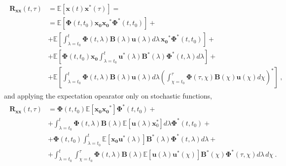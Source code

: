 \documentclass[letterpaper,10pt,english]{jupyterBook}
\begin{document}
\begin{equation*}
\begin{split}\begin{aligned}
  \mathbf{R}_{\mathbf{x} \mathbf{x}}(t, \tau) 
  & = \mathbb{E}\left[ \mathbf{x}(t) \mathbf{x}^*(\tau) \right] = \\
  & = \mathbb{E} \left[ \boldsymbol\Phi(t,t_0) \mathbf{x_0} \mathbf{x_0}^* \boldsymbol\Phi^*(t,t_0) \right] + \\
  & + \mathbb{E}\left[ \int_{\lambda=t_0}^{t}  \boldsymbol\Phi(t,\lambda) \mathbf{B}(\lambda) \mathbf{u}(\lambda) d \lambda \, \mathbf{x_0}^* \boldsymbol\Phi^*(t,t_0) \right] + \\
  & + \mathbb{E}\left[ \boldsymbol\Phi(t,t_0) \mathbf{x_0} \int_{\lambda=t_0}^{t} \mathbf{u}^*(\lambda) \mathbf{B}^*(\lambda)  \boldsymbol\Phi^*(t,\lambda) d\lambda \right] + \\
  & + \mathbb{E}\left[ \int_{\lambda=t_0}^{t}  \boldsymbol\Phi(t,\lambda) \mathbf{B}(\lambda) \mathbf{u}(\lambda) d \lambda \left( \int_{\chi=t_0}^{\tau}  \boldsymbol\Phi(\tau,\chi) \mathbf{B}(\chi) \mathbf{u}(\chi) d \chi \right)^* \right] \ ,
\end{aligned}\end{split}
\end{equation*}
\sphinxAtStartPar
and applying the expectation opearator only on stochastic functions,
\begin{equation*}
\begin{split}\begin{aligned}
  \mathbf{R}_{\mathbf{x} \mathbf{x}}(t, \tau) 
  & = \boldsymbol\Phi(t,t_0) \mathbb{E} \left[  \mathbf{x_0} \mathbf{x_0}^* \right] \boldsymbol\Phi^*(t,t_0) + \\
  & + \int_{\lambda=t_0}^{t}  \boldsymbol\Phi(t,\lambda) \mathbf{B}(\lambda) \mathbb{E} \left[ \mathbf{u}(\lambda) \mathbf{x}^*_0 \right] d \lambda \boldsymbol\Phi^*(t,t_0) + \\
  & + \boldsymbol\Phi(t,t_0) \int_{\lambda=t_0}^{t} \mathbb{E}\left[ \mathbf{x_0} \mathbf{u}^*(\lambda) \right] \mathbf{B}^*(\lambda)  \boldsymbol\Phi^*(t,\lambda) d\lambda  + \\
  & + \int_{\lambda=t_0}^{t} \int_{\chi=t_0}^{\tau}  \boldsymbol\Phi(t,\lambda) \mathbf{B}(\lambda) \mathbb{E}\left[ \mathbf{u}(\lambda) \mathbf{u}^*(\chi) \right]  \mathbf{B}^*(\chi) \boldsymbol\Phi^*(\tau,\chi)  d \lambda \, d \chi \ .
\end{aligned}\end{split}
\end{equation*}
\end{document}
